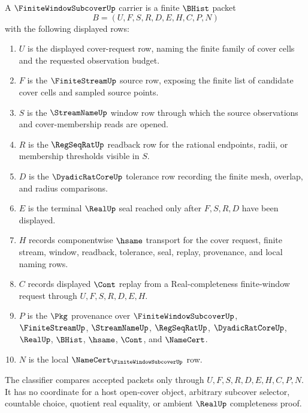 \begin{definition}
\label{def:finite-window-subcover-carrier}
A $\FiniteWindowSubcoverUp$ carrier is a finite $\BHist$ packet
$$
B=(U,F,S,R,D,E,H,C,P,N)
$$
with the following displayed rows:
\begin{enumerate}
\item $U$ is the displayed cover-request row, naming the finite family of cover cells and the requested observation budget.
\item $F$ is the $\FiniteStreamUp$ source row, exposing the finite list of candidate cover cells and sampled source points.
\item $S$ is the $\StreamNameUp$ window row through which the source observations and cover-membership reads are opened.
\item $R$ is the $\RegSeqRatUp$ readback row for the rational endpoints, radii, or membership thresholds visible in $S$.
\item $D$ is the $\DyadicRatCoreUp$ tolerance row recording the finite mesh, overlap, and radius comparisons.
\item $E$ is the terminal $\RealUp$ seal reached only after $F,S,R,D$ have been displayed.
\item $H$ records componentwise $\hsame$ transport for the cover request, finite stream, window, readback, tolerance, seal, replay, provenance, and local naming rows.
\item $C$ records displayed $\Cont$ replay from a Real-completeness finite-window request through $U,F,S,R,D,E,H$.
\item $P$ is the $\Pkg$ provenance over $\FiniteWindowSubcoverUp$, $\FiniteStreamUp$, $\StreamNameUp$, $\RegSeqRatUp$, $\DyadicRatCoreUp$, $\RealUp$, $\BHist$, $\hsame$, $\Cont$, and $\NameCert$.
\item $N$ is the local $\NameCert_{\FiniteWindowSubcoverUp}$ row.
\end{enumerate}
The classifier compares accepted packets only through $U,F,S,R,D,E,H,C,P,N$. It has no coordinate for a host open-cover object, arbitrary subcover selector, countable choice, quotient real equality, or ambient $\RealUp$ completeness proof.
\end{definition}


